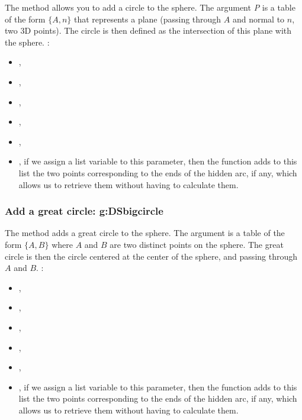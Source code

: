 The  method allows you to add a circle to the sphere. The argument \emph{P} is a table of the form $\{A,n\}$ that represents a plane (passing through $A$ and normal to $n$, two 3D points). The circle is then defined as the intersection of this plane with the sphere. \writeoptions:
\begin{itemize}
    \item {},
    \item {},
    \item {},
    \item {},
    \item {},
    \item {}, if we assign a list variable to this  parameter, then the function adds to this list the two points corresponding to the ends of the hidden arc, if any, which allows us to retrieve them without having to calculate them.
\end{itemize}

\subsubsection{Add a great circle: g:DSbigcircle}

The method  adds a great circle to the sphere. The argument  is a table of the form $\{A,B\}$ where $A$ and $B$ are two distinct points on the sphere. The great circle is then the circle centered at the center of the sphere, and passing through $A$ and $B$. \writeoptions:
\begin{itemize}
    \item {},
    \item {},
    \item {},
    \item {},
    \item {},
    \item {}, if we assign a list variable to this  parameter, then the function adds to this list the two points corresponding to the ends of the hidden arc, if any, which allows us to retrieve them without having to calculate them.
\end{itemize}

